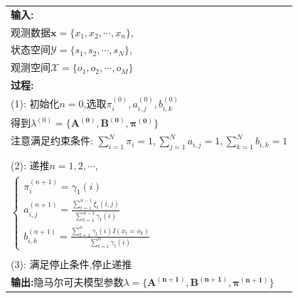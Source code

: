 \documentclass[UTF8,a4paper]{ctexart}%
\begin{document}
            \begin{tabular}{l}
              \hline
              \textbf{输入:}\\
              观测数据$\bm{x}=\{x_1,x_2, \cdots , x_n\}$,\\
              状态空间$\mathcal{Y} = \{s_1,s_2,\cdots , s_N\}$,\\
              观测空间$\mathcal{X} = \{o_1,o_2,\cdots , o_M\}$\\
              \textbf{过程:}\\
                (1): 初始化$n = 0$,选取$\pi_i^{(0)},a_{i,j}^{(0)},b_{i,k}^{(0)}$\\
                    得到$\lambda^{(0)} = \{\bm{A^{(0)} , B^{(0)} , \pi^{(0)}}\}$\\
                    注意满足约束条件:
                    $\sum_{i= 1}^N \pi_i = 1,\sum_{j = 1}^N a_{i,j} = 1,\sum_{k = 1}^N b_{i,k} = 1$\\\\
                (2): 递推$n = 1,2,\cdots,$\\
                  $\begin{cases}
                    \pi_i^{(n+1)} = \gamma_1(i)\\
                    a_{i,j}^{(n+1)} = \frac{\sum_{t = 1}^{n-1} \xi_t(i,j)}{\sum_{t = 1}^{n-1} \gamma_t(i)}\\
                    b_{i,k}^{(n+1)} = \frac{\sum_{t = 1}^{n} \gamma_t(i)I(x_t = o_k)}{\sum_{t = 1}^{n} \gamma_t(i)}
                  \end{cases}$\\\\
                (3): 满足停止条件,停止递推\\
              \textbf{输出:}隐马尔可夫模型参数$\lambda = \{\bm{A^{(n+1)},B^{(n+1)},\pi^{(n+1)}}\}$\\
              \hline
            \end{tabular}
\end{document}
